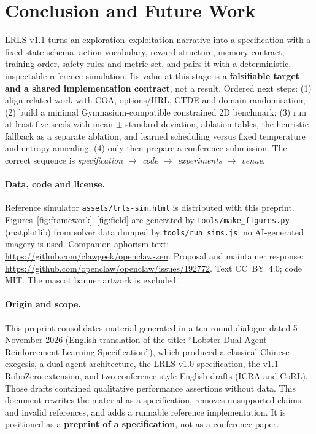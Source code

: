 \documentclass[11pt,a4paper]{article}
\begin{document}
\section{Conclusion and Future Work}
LRLS-v1.1 turns an exploration--exploitation narrative into a specification with a fixed state schema, action vocabulary, reward structure, memory contract, training order, safety rules and metric set, and pairs it with a deterministic, inspectable reference simulation. Its value at this stage is a \textbf{falsifiable target and a shared implementation contract}, not a result. Ordered next steps: (1) align related work with COA, options/HRL, CTDE and domain randomisation; (2) build a minimal Gymnasium-compatible constrained 2D benchmark; (3) run at least five seeds with mean $\pm$ standard deviation, ablation tables, the heuristic fallback as a separate ablation, and learned scheduling versus fixed temperature and entropy annealing; (4) only then prepare a conference submission. The correct sequence is \emph{specification $\to$ code $\to$ experiments $\to$ venue}.

\paragraph{Data, code and license.} Reference simulator \texttt{assets/lrls-sim.html} is distributed with this preprint. Figures~\ref{fig:framework}--\ref{fig:field} are generated by \texttt{tools/make\_figures.py} (matplotlib) from solver data dumped by \texttt{tools/run\_sims.js}; no AI-generated imagery is used. Companion aphorism text: \url{https://github.com/clawgeek/openclaw-zen}. Proposal and maintainer response: \url{https://github.com/openclaw/openclaw/issues/192772}. Text CC~BY~4.0; code MIT. The mascot banner artwork is excluded.

\paragraph{Origin and scope.} This preprint consolidates material generated in a ten-round dialogue dated 5 November 2026 (English translation of the title: ``Lobster Dual-Agent Reinforcement Learning Specification''), which produced a classical-Chinese exegesis, a dual-agent architecture, the LRLS-v1.0 specification, the v1.1 RoboZero extension, and two conference-style English drafts (ICRA and CoRL). Those drafts contained qualitative performance assertions without data. This document rewrites the material as a specification, removes unsupported claims and invalid references, and adds a runnable reference implementation. It is positioned as a \textbf{preprint of a specification}, not as a conference paper.
\end{document}
